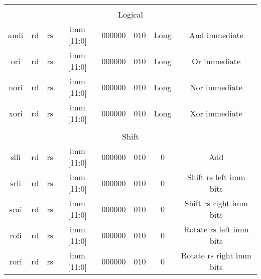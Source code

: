 \documentclass{article}
\begin{document}
\begin{center}
\begin{longtable}{|c|l|r|l|r|l|r|l|r|l|r|c|c|}
    
    \hline              \multicolumn{13}{|c|}{} \\
    
                        \multicolumn{13}{|c|}{Logical} \\
    \hline andi     &   \multicolumn{2}{|c|}{rd}    &   \multicolumn{2}{|c|}{rs}    &   \multicolumn{2}{|c|}{imm [11:0]}    &   \multicolumn{2}{|c|}{000000}    &   \multicolumn{2}{|c|}{010}   &   Long    &   And immediate \\
    \hline ori      &   \multicolumn{2}{|c|}{rd}    &   \multicolumn{2}{|c|}{rs}    &   \multicolumn{2}{|c|}{imm [11:0]}    &   \multicolumn{2}{|c|}{000000}    &   \multicolumn{2}{|c|}{010}   &   Long    &   Or immediate \\
    \hline nori     &   \multicolumn{2}{|c|}{rd}    &   \multicolumn{2}{|c|}{rs}    &   \multicolumn{2}{|c|}{imm [11:0]}    &   \multicolumn{2}{|c|}{000000}    &   \multicolumn{2}{|c|}{010}   &   Long    &   Nor immediate \\
    \hline xori     &   \multicolumn{2}{|c|}{rd}    &   \multicolumn{2}{|c|}{rs}    &   \multicolumn{2}{|c|}{imm [11:0]}    &   \multicolumn{2}{|c|}{000000}    &   \multicolumn{2}{|c|}{010}   &   Long    &   Xor immediate \\
    
    
    \hline              \multicolumn{13}{|c|}{} \\
    
                        \multicolumn{13}{|c|}{Shift} \\
    \hline slli     &   \multicolumn{2}{|c|}{rd}    &   \multicolumn{2}{|c|}{rs}    &   \multicolumn{2}{|c|}{imm [11:0]}    &   \multicolumn{2}{|c|}{000000}    &   \multicolumn{2}{|c|}{010}   &   0   &   Add \\
    \hline srli     &   \multicolumn{2}{|c|}{rd}    &   \multicolumn{2}{|c|}{rs}    &   \multicolumn{2}{|c|}{imm [11:0]}    &   \multicolumn{2}{|c|}{000000}    &   \multicolumn{2}{|c|}{010}   &   0   &   Shift rs left imm bits \\
    \hline srai     &   \multicolumn{2}{|c|}{rd}    &   \multicolumn{2}{|c|}{rs}    &   \multicolumn{2}{|c|}{imm [11:0]}    &   \multicolumn{2}{|c|}{000000}    &   \multicolumn{2}{|c|}{010}   &   0   &   Shift rs right imm bits \\
    \hline roli     &   \multicolumn{2}{|c|}{rd}    &   \multicolumn{2}{|c|}{rs}    &   \multicolumn{2}{|c|}{imm [11:0]}    &   \multicolumn{2}{|c|}{000000}    &   \multicolumn{2}{|c|}{010}   &   0   &   Rotate rs left imm bits \\
    \hline rori     &   \multicolumn{2}{|c|}{rd}    &   \multicolumn{2}{|c|}{rs}    &   \multicolumn{2}{|c|}{imm [11:0]}    &   \multicolumn{2}{|c|}{000000}    &   \multicolumn{2}{|c|}{010}   &   0   & Rotate rs right imm bits \\
    

\end{longtable}
\end{center}
\end{document}
